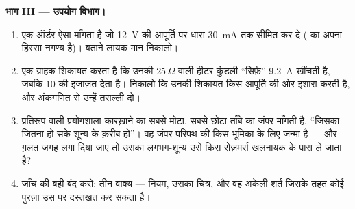 \begin{problem}
\medskip\noindent\textbf{भाग III --- उपयोग विभाग।}
\begin{enumerate}[resume]
  \item एक ऑर्डर ऐसा  माँगता है जो \qty{12}{V} की आपूर्ति
        पर धारा \qty{30}{mA} तक सीमित कर दे ( का अपना हिस्सा
        नगण्य है)। बताने लायक मान निकालो।
  \item एक ग्राहक शिकायत करता है कि उनकी $25\,\Omega$ वाली हीटर
        कुंडली ``सिर्फ़'' \qty{9.2}{A} खींचती है, जबकि  $10$
        की इजाज़त देता है। निकालो कि उनकी शिकायत किस आपूर्ति 
        की ओर इशारा करती है, और अंकगणित से उन्हें तसल्ली दो।
  \item प्रतिरूप वाली प्रयोगशाला कारख़ाने का सबसे मोटा, सबसे छोटा
        ताँबे का जंपर माँगती है, ``जिसका  जितना हो सके शून्य
        के क़रीब हो''। वह जंपर परिपथ की किस भूमिका के लिए जन्मा है
        --- और ग़लत जगह लगा दिया जाए तो उसका लगभग-शून्य  उसे
        किस रोज़मर्रा खलनायक के पास ले जाता है?
  \item जाँच की बही बंद करो: तीन वाक्य --- नियम, उसका चित्र, और वह
        अकेली शर्त जिसके तहत कोई पुरज़ा उस पर दस्तख़त कर सकता है।
\end{enumerate}
\end{problem}
